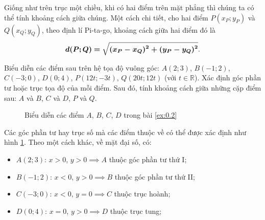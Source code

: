 Giống như trên trục một chiều, khi có hai điểm trên mặt phẳng thì chúng ta có thể tính khoảng cách giữa chúng. Một cách chi tiết, cho hai điểm $P(x_P;y_P)$ và $Q(x_Q;y_Q)$, theo định lí Pi-ta-go, khoảng cách giữa hai điểm đó là $$\bm{d(P;Q)=\sqrt{(x_P-x_Q)^2+(y_P-y_Q)^2}}.$$

\exercise[ex:0.2] Biểu diễn các điểm sau trên hệ tọa độ vuông góc: $A(2;3)$, $B(-1;2)$, $C(-3;0)$, $D(0;4)$, $P(12t;-3t)$, $Q(20t;12t)$ (với $t \in \mathbb{R}$). Xác định góc phần tư hoặc trục tọa độ của mỗi điểm. Sau đó, tính khoảng cách giữa những cặp điểm sau: $A$ và $B$, $C$ và $D$, $P$ và $Q$.

\solution[ex:0.2]

\begin{figure}[h]
   \centering
   \caption{Biểu diễn các điểm $A$, $B$, $C$, $D$ trong bài \ref{ex:0.2}}
   \label{fig:toa do vuong goc bai tap}
\end{figure}

Các góc phần tư hay trục số mà các điểm thuộc về có thể được xác định như hình \ref{fig:toa do vuong goc bai tap}. Theo một cách khác, về mặt đại số, có:
\begin{itemize}
   \item $A(2;3)$: $x>0$, $y>0 \implies A$ thuộc góc phần tư thứ I;
   \item $B(-1;2)$: $x<0$, $y>0 \implies B$ thuộc góc phần tư thứ II;
   \item $C(-3;0)$: $x<0$, $y=0 \implies C$ thuộc trục hoành;
   \item $D(0;4)$: $x=0$, $y>0 \implies D$ thuộc trục tung;
\end{itemize}


